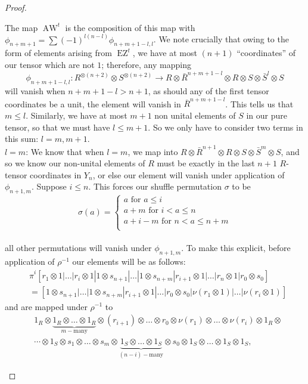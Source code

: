 \documentclass{article}
\newcommand{\awt}{\operatorname{AW}^t}
\newcommand{\ezt}{\operatorname{EZ}^t}
\theoremstyle{plain}
\theoremstyle{definition}
\begin{document}
\begin{proof}
\begin{pfparts}
The map $\awt$ is the composition of this map with $\phi_{n+m+1} = \sum (-1)^{l(n-l)}\phi_{n+m+1-l, l}$. We note crucially that owing to the form of elements arising from $\ezt$, we have at most $(n+1)$ ``coordinates'' of our tensor which are not $1$; therefore, any mapping 
$$\phi_{n+m+1-l,l}: R^{\otimes (n+2)} \otimes S^{\otimes (n+2)} \rightarrow R  \otimes \bar{R}^{n+m+1-l}\otimes R \otimes S \otimes \bar{S}^l \otimes S$$ 
will vanish when $n+m+1-l > n+1$, as should any of the first tensor coordinates be a unit, the element will vanish in $\overline{R}^{n+m+1-l}$. This tells us that $m \leq l$. Similarly, we have at most $m+1$ non unital elements of $S$ in our pure tensor, so that we must have $l \leq m+1$. So we only have to consider two terms in this sum: $l=m,m+1$. \\[10pt]
$l=m$: We know that when $l=m$, we map into $R  \otimes \bar{R}^{n+1}\otimes R \otimes S \otimes \bar{S}^m \otimes S$, and so we know our non-unital elements of $R$ must be exactly in the last $n+1$ $R$-tensor coordinates in $Y_n$, or else our element will vanish under application of $\phi_{n+1,m}$. Suppose $i \leq n$. This forces our shuffle permutation $\sigma$ to be  
$$\sigma(a)= \begin{cases}  a \textrm{ for } a \leq i \\ a + m \textrm{ for } i < a \leq n \\  a+i-m \textrm{ for } n<a \leq n+m \\ \end{cases}$$   \\
all other permutations will vanish under $\phi_{n+1, m}$. To make this explicit, before application of $\rho^{-1}$ our elements will be as follows:
$$\begin{aligned} &\hat{\pi}^i[r_1 \otimes 1 | \ldots | r_i \otimes 1| 1 \otimes s_{n+1} | \ldots | 1 \otimes s_{n+m} | r_{i+1} \otimes 1 | \ldots | r_{n} \otimes 1 | r_0 \otimes s_0] \\
&= [1 \otimes s_{n+1} | \ldots | 1 \otimes s_{n+m} | r_{i+1} \otimes 1 | \ldots | r_0 \otimes s_0| \nu(r_1 \otimes 1) | \ldots |\nu(r_i \otimes 1)] \end{aligned}$$
and are mapped under $\rho^{-1}$ to 
$$\begin{aligned} & 1_R \otimes \underbrace{1_R \otimes \ldots  \otimes 1_R}_{m-\textrm{many}} \otimes  (r_{i+1}) \otimes \ldots \otimes r_0 \otimes \nu(r_1 ) \otimes \ldots \otimes \nu(r_i ) \otimes 1_R \otimes \\
&\cdots \otimes 1_S \otimes s_1 \otimes \ldots \otimes s_m \otimes \underbrace{1_S \otimes \ldots \otimes 1_S}_{(n-i)-\textrm{many}} \otimes s_0 \otimes 1_S \otimes \ldots \otimes 1_S \otimes 1_S,

\end{aligned}$$
\end{pfparts}
\end{proof}
\end{document}
